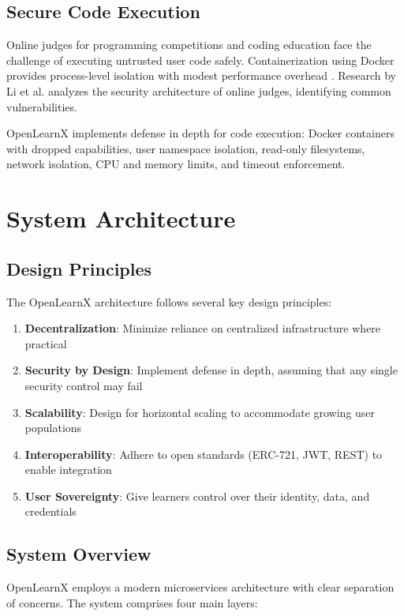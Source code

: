 \documentclass[conference]{IEEEtran}
\begin{document}
\subsection{Secure Code Execution}

Online judges for programming competitions and coding education face the challenge of executing untrusted user code safely. Containerization using Docker provides process-level isolation with modest performance overhead \cite{b21}. Research by Li et al. \cite{b15} analyzes the security architecture of online judges, identifying common vulnerabilities.

OpenLearnX implements defense in depth for code execution: Docker containers with dropped capabilities, user namespace isolation, read-only filesystems, network isolation, CPU and memory limits, and timeout enforcement.

\section{System Architecture}

\subsection{Design Principles}

The OpenLearnX architecture follows several key design principles:

\begin{enumerate}
    \item \textbf{Decentralization}: Minimize reliance on centralized infrastructure where practical
    \item \textbf{Security by Design}: Implement defense in depth, assuming that any single security control may fail
    \item \textbf{Scalability}: Design for horizontal scaling to accommodate growing user populations
    \item \textbf{Interoperability}: Adhere to open standards (ERC-721, JWT, REST) to enable integration
    \item \textbf{User Sovereignty}: Give learners control over their identity, data, and credentials
\end{enumerate}

\subsection{System Overview}

OpenLearnX employs a modern microservices architecture with clear separation of concerns. The system comprises four main layers:
\end{document}
